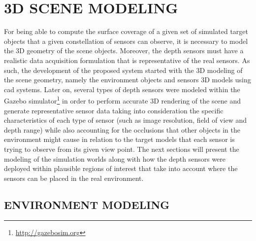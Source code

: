 \section{\uppercase{3D scene modeling}}\label{sec:modeling}

\noindent For being able to compute the surface coverage of a given set of simulated target objects that a given constellation of sensors can observe, it is necessary to model the 3D geometry of the scene objects. Moreover, the depth sensors must have a realistic data acquisition formulation that is representative of the real sensors. As such, the development of the proposed system started with the 3D modeling of the scene geometry, namely the environment objects and sensors 3D models using \gls{cad} systems. Later on, several types of depth sensors were modeled within the Gazebo simulator\footnote{\url{http://gazebosim.org}} in order to perform accurate 3D rendering of the scene and generate representative sensor data taking into consideration the specific characteristics of each type of sensor (such as image resolution, field of view and depth range) while also accounting for the occlusions that other objects in the environment might cause in relation to the target models that each sensor is trying to observe from its given view point. The next sections will present the modeling of the simulation worlds along with how the depth sensors were deployed within plausible regions of interest that take into account where the sensors can be placed in the real environment.


\subsection{\uppercase{Environment modeling}}

